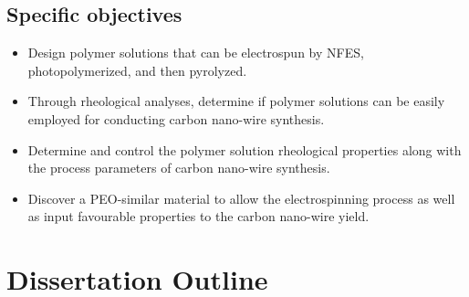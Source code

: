 \subsection{Specific objectives}

\begin{itemize}
	\item{
	Design polymer solutions that can be electrospun by NFES, photopolymerized, and then pyrolyzed.
    }
    \item{
    Through rheological analyses, determine if polymer solutions can be easily employed for conducting carbon nano-wire synthesis.
    }
    \item{
    Determine and control the polymer solution rheological properties along with the process parameters of carbon nano-wire synthesis.
    }
    \item{
    Discover a PEO-similar material to allow the electrospinning process as well as input favourable properties to the carbon nano-wire yield.
    }
\end{itemize}

\section{Dissertation Outline}


